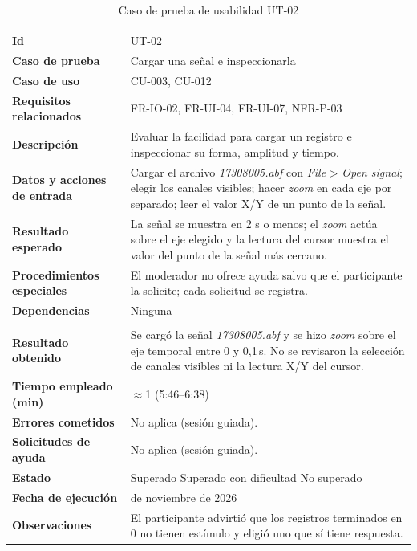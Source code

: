 \documentclass[12pt,letterpaper,oneside]{article}
\DeclareRobustCommand{\_}{\textunderscore\allowbreak}
\newcommand{\fechasesion}{12 de noviembre de 2026}
\newcommand{\casilla}[1]{%
    \fbox{\makebox[1em][c]{#1}}%
}
\begin{document}
\begin{center}
\small
\begin{longtable}{|>{\raggedright\arraybackslash}p{}|>{\raggedright\arraybackslash}p{}|}
\hline
\endfirsthead
\hline
\endhead
\hline
\endfoot
\hline
\caption{Caso de prueba de usabilidad UT-02} \label{tab:ut-02} \\
\endlastfoot
\textbf{Id} & UT-02 \\
\hline
\textbf{Caso de prueba} & Cargar una señal e inspeccionarla \\
\hline
\textbf{Caso de uso} & CU-003, CU-012 \\
\hline
\textbf{Requisitos relacionados} & FR-IO-02, FR-UI-04, FR-UI-07, NFR-P-03 \\
\hline
\textbf{Descripción} & Evaluar la facilidad para cargar un registro e inspeccionar su forma, amplitud y tiempo. \\
\hline
\textbf{Datos y acciones de entrada} & Cargar el archivo \textit{17308005.abf} con \textit{File} > \textit{Open signal}; elegir los canales visibles; hacer \textit{zoom} en cada eje por separado; leer el valor X/Y de un punto de la señal. \\
\hline
\textbf{Resultado esperado} & La señal se muestra en 2 s o menos; el \textit{zoom} actúa sobre el eje elegido y la lectura del cursor muestra el valor del punto de la señal más cercano. \\
\hline
\textbf{Procedimientos especiales} & El moderador no ofrece ayuda salvo que el participante la solicite; cada solicitud se registra. \\
\hline
\textbf{Dependencias} & Ninguna \\
\hline
\multicolumn{2}{|c|}{\textbf{Información para el seguimiento}} \\
\hline
\textbf{Resultado obtenido} & Se cargó la señal \textit{17308005.abf} y se hizo \textit{zoom} sobre el eje temporal entre 0 y 0,1\,s. No se revisaron la selección de canales visibles ni la lectura X/Y del cursor. \\
\hline
\textbf{Tiempo empleado (min)} & $\approx$1 (5:46--6:38) \\
\hline
\textbf{Errores cometidos} & No aplica (sesión guiada). \\
\hline
\textbf{Solicitudes de ayuda} & No aplica (sesión guiada). \\
\hline
\textbf{Estado} & \casilla{x} Superado \qquad \casilla{} Superado con dificultad \qquad \casilla{} No superado \\
\hline
\textbf{Fecha de ejecución} & \fechasesion \\
\hline
\textbf{Observaciones} & El participante advirtió que los registros terminados en 0 no tienen estímulo y eligió uno que sí tiene respuesta. \\
\hline
\end{longtable}
\end{center}
\end{document}
